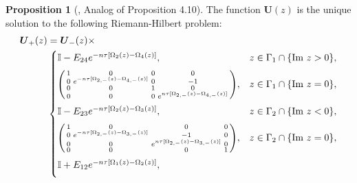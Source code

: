 \documentclass[usenames,dvipsnames]{article}
\theoremstyle{definition}
\newtheorem{prop}{Proposition}[section]
\numberwithin{equation}{section}
\numberwithin{figure}{section}
\begin{document}
\begin{prop}[\cite{DHL1}, Analog of Proposition 4.10]
        The function $\boldsymbol{U}(z)$ is the unique solution to the following Riemann-Hilbert problem:
            \begin{align}\label{U-jumps}
                \boldsymbol{U}_{+}(z) &= \boldsymbol{U}_{-}(z) \times \nonumber\\
                    &\begin{cases}
                        \vspace{2mm}
                        \mathbb{I} - E_{24}e^{-n\tau[\Omega_2(z) - \Omega_4(z)]}, 
                        & z \in \Gamma_1 \cap \{\text{Im } z > 0\},\\
                        \vspace{2mm}
                        \begin{psmallmatrix}
                            1 & 0 & 0 & 0 \\
                            0 & e^{-n\tau[\Omega_{2,-}(z)-\Omega_{4,-}(z)]} & 0 & -1\\
                            0 & 0 & 1 & 0 \\
                            0 & 0 & 0 & e^{n\tau[\Omega_{2,-}(z)-\Omega_{4,-}(z)]}
                        \end{psmallmatrix}, 
                        & z \in \Gamma_1 \cap \{\text{Im } z = 0\},\\
                        \vspace{2mm}
                        \mathbb{I} - E_{23}e^{-n\tau[\Omega_2(z) - \Omega_3(z)]}, 
                        & z \in \Gamma_2 \cap \{\text{Im } z < 0\},\\
                        \vspace{2mm}
                        \begin{psmallmatrix}
                            1 & 0 & 0 & 0 \\
                            0 & e^{-n\tau[\Omega_{2,-}(z) - \Omega_{3,-}(z)]} & -1 & 0\\
                            0 & 0 & e^{n\tau[\Omega_{2,-}(z) - \Omega_{3,-}(z)]} & 0 \\
                            0 & 0 & 0 & 1
                        \end{psmallmatrix}, 
                        & z \in \Gamma_2 \cap \{\text{Im } z = 0\},\\
                        \vspace{2mm}
                        \mathbb{I} + E_{12}e^{-n\tau[\Omega_1(z) - \Omega_2(z)]},

\end{cases}
\end{align}
\end{prop}
\end{document}
